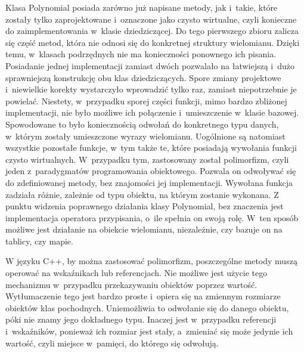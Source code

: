 Klasa Polynomial posiada zarówno już napisane metody, jak i~takie, które zostały tylko zaprojektowane i~oznaczone jako czysto wirtualne, czyli konieczne do zaimplementowania w~klasie dziedziczącej. Do tego pierwszego zbioru zalicza się część metod, która nie odnosi się do konkretnej struktury wielomianu. Dzięki temu, w~klasach podrzędnych nie ma konieczności ponownego ich pisania. Posiadanie jednej implementacji zamiast dwóch pozwalało na łatwiejszą i~dużo sprawniejszą konstrukcję obu klas dziedziczących. Spore zmiany projektowe i~niewielkie korekty wystarczyło wprowadzić tylko raz, zamiast niepotrzebnie je powielać. Niestety, w~przypadku sporej części funkcji, mimo bardzo zbliżonej implementacji, nie było możliwe ich połączenie i~umieszczenie w~klasie bazowej. Spowodowane to było koniecznością odwołań do konkretnego typu danych, w~którym zostały umieszczone wyrazy wielomianu. Uogólnione są natomiast wszystkie pozostałe funkcje, w~tym także te, które posiadają wywołania funkcji czysto wirtualnych. W~przypadku tym, zastosowany został polimorfizm, czyli jeden z~paradygmatów programowania obiektowego. Pozwala on odwoływać się do zdefiniowanej metody, bez znajomości jej implementacji. Wywołana funkcja zadziała różnie, zależnie od typu obiektu, na którym zostanie wykonana. Z punktu widzenia poprawnego działania klasy Polynomial, bez znaczenia jest implementacja operatora przypisania, o~ile spełnia on swoją rolę. W~ten sposób możliwe jest działanie na obiekcie wielomianu, niezależnie, czy bazuje on na tablicy, czy mapie.

W języku C++, by można zastosować polimorfizm, poszczególne metody muszą operować na wskaźnikach lub referencjach. Nie możliwe jest użycie tego mechanizmu w~przypadku przekazywaniu obiektów poprzez wartość. Wytłumaczenie tego jest bardzo proste i~opiera się na zmiennym rozmiarze obiektów klas pochodnych. Uniemożliwia to odwołanie się do danego obiektu, póki nie znamy jego dokładnego typu. Inaczej jest w~przypadku referencji i~wskaźników, ponieważ ich rozmiar jest stały, a~zmieniać się może jedynie ich wartość, czyli miejsce w~pamięci, do którego się odwołują.

